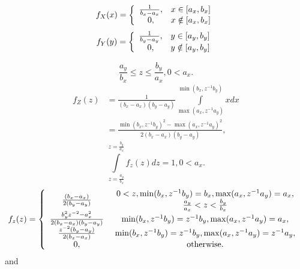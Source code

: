 \documentclass[titlepage,fleqn]{article}%
\begin{document}
\label{UD}%


\bigskip%

\[
f_{X}(x)=\left\{
\begin{array}
[c]{cc}%
\frac{1}{b_{x}-a_{x}}, & x\in\lbrack a_{x},b_{x}]\\
0, & x\notin\lbrack a_{x},b_{x}]
\end{array}
\right.
\]%
\[
f_{Y}(y)=\left\{
\begin{array}
[c]{cc}%
\frac{1}{b_{y}-a_{y}}, & y\in\lbrack a_{y},b_{y}]\\
0, & y\notin\lbrack a_{y},b_{y}]
\end{array}
\right.
\]
%

\[
\frac{a_{y}}{b_{x}}\leq z\leq\frac{b_{y}}{a_{x}},0<a_{x}.
\]%
\begin{align*}
f_{Z}(z)  &  =\frac{1}{\left(  b_{x}-a_{x}\right)  \left(  b_{y}-a_{y}\right)
}%
{\displaystyle\int\limits_{\max(a_{x},z^{-1}a_{y})}^{\min(b_{x},z^{-1}b_{y})}}
xdx\\
&  =\frac{\min(b_{x},z^{-1}b_{y})^{2}-\max(a_{x},z^{-1}a_{y})^{2}}{2\left(
b_{x}-a_{x}\right)  \left(  b_{y}-a_{y}\right)  },
\end{align*}%
\[%
{\displaystyle\int\limits_{z=\frac{a_{y}}{b_{x}}}^{z=\frac{b_{y}}{a_{x}}}}
f_{z}(z)dz=1,0<a_{x}.
\]%
\[
f_{z}(z)=\left\{
\begin{array}
[c]{cc}%
\frac{\left(  b_{x}-a_{x}\right)  }{2\left(  b_{y}-a_{y}\right)  } &
\begin{array}
[c]{c}%
0<z,\min(b_{x},z^{-1}b_{y})=b_{x},\max(a_{x},z^{-1}a_{y})=a_{x},\\
\frac{a_{y}}{a_{x}}<z<\frac{b_{y}}{b_{x}}%
\end{array}
\\
\frac{b_{y}^{2}z^{-2}-a_{x}^{2}}{2\left(  b_{x}-a_{x}\right)  \left(
b_{y}-a_{y}\right)  } & \min(b_{x},z^{-1}b_{y})=z^{-1}b_{y},\max(a_{x}%
,z^{-1}a_{y})=a_{x},\\
\frac{z^{-2}\left(  b_{y}-a_{y}\right)  }{2\left(  b_{x}-a_{x}\right)  } &
\min(b_{x},z^{-1}b_{y})=z^{-1}b_{y},\max(a_{x},z^{-1}a_{y})=z^{-1}a_{y},\\
0, & \text{otherwise.}%
\end{array}
\right.
\]
and%
\end{document}

